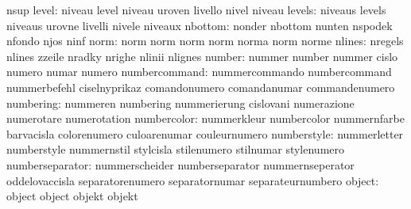                            nsup
                    level: niveau                    level
                           niveau                    uroven
                           livello                   nivel
                           niveau
                   levels: niveaus                   levels
                           niveaus                   urovne
                           livelli                   nivele
                           niveaux
                  nbottom: nonder                    nbottom
                           nunten                    nspodek
                           nfondo                    njos
                           ninf
                     norm: norm                      norm
                           norm                      norm
                           norma                     norm
                           norme
                   nlines: nregels                   nlines
                           zzeile                    nradky
                           nrighe                    nlinii
                           nlignes
                   number: nummer                    number
                           nummer                    cislo
                           numero                    numar
                           numero
            numbercommand: nummercommando            numbercommand
                           nummerbefehl              ciselnyprikaz
                           comandonumero             comandanumar
                           commandenumero
                numbering: nummeren                  numbering
                           nummerierung              cislovani
                           numerazione               numerotare
                           numerotation
              numbercolor: nummerkleur               numbercolor
                           nummernfarbe              barvacisla
                           colorenumero              culoarenumar
                           couleurnumero
              numberstyle: nummerletter              numberstyle
                           nummernstil               stylcisla
                           stilenumero               stilnumar
                           stylenumero
          numberseparator: nummerscheider            numberseparator
                           nummernseperator          oddelovaccisla
                           separatorenumero          separatornumar
                           separateurnumbero
                   object: object                    object
                           objekt                    objekt
